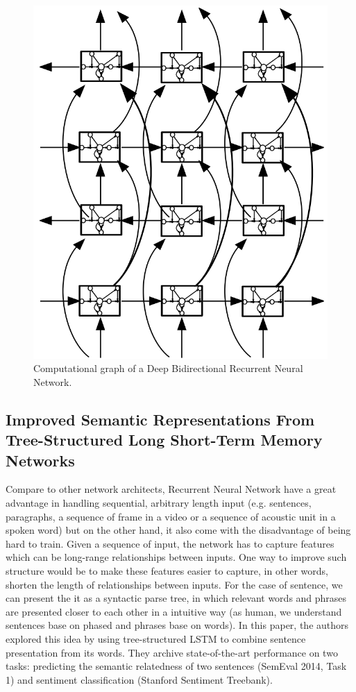 \begin{figure}[H]
	\centering
	\includegraphics[scale=0.4]{figure/dblstm}
	\caption{Computational graph of a Deep Bidirectional Recurrent Neural Network\cite{GravesLSTM}.}
	\label{fig:dblstm}
\end{figure}

\subsection{Improved Semantic Representations From Tree-Structured Long Short-Term Memory Networks}
Compare to other network architects, Recurrent Neural Network have a great advantage in handling sequential, arbitrary length input (e.g. sentences, paragraphs, a sequence of frame in a video or a sequence of acoustic unit in a spoken word) but on the other hand, it also come with the disadvantage of being hard to train\cite{hardRNN}.
Given a sequence of input, the network has to capture features which can be long-range relationships between inputs\cite{socher2013recursive}.
One way to improve such structure would be to make these features easier to capture, in other words, shorten the length of relationships between inputs.
For the case of sentence, we can present the it as a syntactic parse tree, in which relevant words and phrases are presented closer to each other in a intuitive way (as human, we understand sentences base on phased and phrases base on words). 
In this paper\cite{treeLSTM}, the authors explored this idea by using tree-structured LSTM to combine sentence presentation from its words.
They archive state-of-the-art performance on two tasks: predicting the semantic relatedness of two sentences (SemEval 2014, Task 1\cite{SemeEvalTask1}) and sentiment classification (Stanford Sentiment Treebank\cite{socher2013recursive}).


